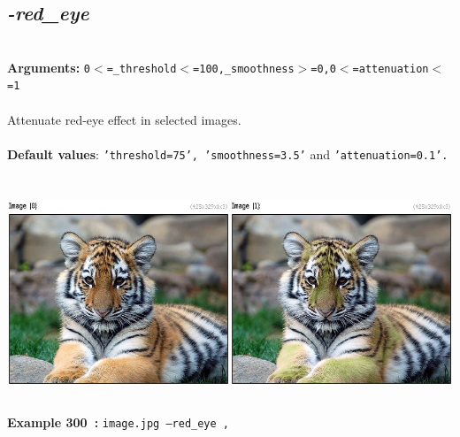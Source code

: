 \documentclass[a4paper,11pt,twoside]{book}
\begin{document}
\subsection{\emph{-red\_eye} }\vspace*{-0.5em}
~\\\textbf{Arguments: } 
{\small \texttt{0$<$=\_threshold$<$=100,\_smoothness$>$=0,0$<$=attenuation$<$=1}}\\~\\
Attenuate red-eye effect in selected images.
~\\~\\\textbf{Default values}: {\small \texttt{'threshold=75', 'smoothness=3.5'} and \texttt{'attenuation=0.1'.}}
\begin{center}\includegraphics[keepaspectratio=true,height=7cm,width=\textwidth]{img/gmic_def300.jpg}\\
{\footnotesize \textbf{Example 300~:} \texttt{image.jpg --red\_eye ,}}
\end{center}
\end{document}

